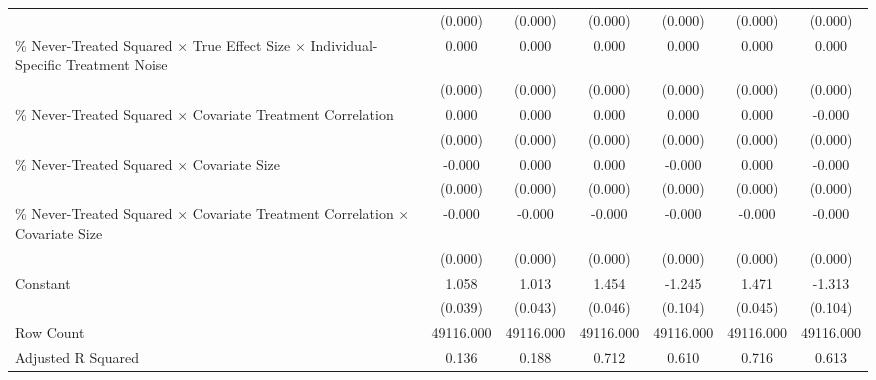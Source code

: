 \begin{table}[htbp]
\begin{tabular}{l*{6}{c}}
                    &     (0.000)         &     (0.000)         &     (0.000)         &     (0.000)         &     (0.000)         &     (0.000)         \\
\% Never-Treated Squared $\times$ True Effect Size $\times$ Individual-Specific Treatment Noise&       0.000\sym{*}  &       0.000\sym{*}  &       0.000         &       0.000         &       0.000         &       0.000         \\
                    &     (0.000)         &     (0.000)         &     (0.000)         &     (0.000)         &     (0.000)         &     (0.000)         \\
\% Never-Treated Squared $\times$ Covariate Treatment Correlation&       0.000\sym{**} &       0.000         &       0.000         &       0.000         &       0.000         &      -0.000         \\
                    &     (0.000)         &     (0.000)         &     (0.000)         &     (0.000)         &     (0.000)         &     (0.000)         \\
\% Never-Treated Squared $\times$ Covariate Size&      -0.000         &       0.000         &       0.000         &      -0.000\sym{**} &       0.000         &      -0.000\sym{*}  \\
                    &     (0.000)         &     (0.000)         &     (0.000)         &     (0.000)         &     (0.000)         &     (0.000)         \\
\% Never-Treated Squared $\times$ Covariate Treatment Correlation $\times$ Covariate Size&      -0.000\sym{*}  &      -0.000\sym{*}  &      -0.000         &      -0.000         &      -0.000         &      -0.000         \\
                    &     (0.000)         &     (0.000)         &     (0.000)         &     (0.000)         &     (0.000)         &     (0.000)         \\
Constant            &       1.058\sym{***}&       1.013\sym{***}&       1.454\sym{***}&      -1.245\sym{***}&       1.471\sym{***}&      -1.313\sym{***}\\
                    &     (0.039)         &     (0.043)         &     (0.046)         &     (0.104)         &     (0.045)         &     (0.104)         \\
\hline
Row Count           &   49116.000         &   49116.000         &   49116.000         &   49116.000         &   49116.000         &   49116.000         \\
Adjusted R Squared  &       0.136         &       0.188         &       0.712         &       0.610         &       0.716         &       0.613         \\

\end{tabular}
\end{table}
